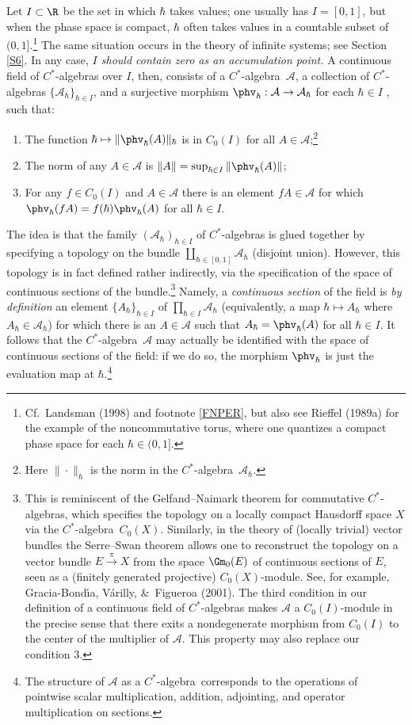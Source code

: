 \documentclass[12pt]{article}
\newcommand{\ca}{$C^*$-algebra} \newcommand{\jba}{JB-algebra}
\newcommand{\raw}{\rightarrow} \newcommand{\rat}{\mapsto}
\newcommand{\CA}{{\mathcal A}} \newcommand{\CB}{{\mathcal B}}
\begin{document}
 Let  $I\subset \R$ be the set in which $\hbar$ takes values; one usually has $I=[0,1]$, but when the phase space is compact, $\hbar$ often takes values in a countable subset of $(0,1]$.\footnote{Cf.\ Landsman (1998) and footnote  \ref{FNPER}, but also see Rieffel (1989a) for the example of the noncommutative torus, where one quantizes a compact phase space for each $\hbar\in(0,1]$.} The same situation occurs in the theory of infinite systems; see Section \ref{S6}.  In any case, {\it $I$ should contain zero as an accumulation point.}  A continuous field of $C^*$-algebras over $I$, then,  consists of a
 \ca\ $\CA$, a collection of \ca s $\{\CA_{\hbar}\}_{{\hbar}\in I}$, and a surjective morphism $\phv_{\hbar}:\CA\raw\CA_{\hbar}$ for each $\hbar\in I$ , such that:
\begin{enumerate}
\item
The function ${\hbar}\mapsto  \|\phv_{\hbar}(A)\|_{\hbar}$ is in $C_0(I)$ for all $A\in\CA$;\footnote{Here $\|\cdot\|_{\hbar}$ is the norm in the \ca\ $\CA_{\hbar}$.}
\item
The norm of any $A\in\CA$ is $\| A\|=\sup_{{\hbar}\in I}\|\phv_{\hbar}(A)\|$;
\item
For any $f\in C_0(I)$ and $A\in\CA$ there is an element $fA\in\CA$ for
which $\phv_{\hbar}(fA)=f({\hbar})\phv_{\hbar}(A)$ for all ${\hbar}\in I$.
\end{enumerate}
 
The idea is that the  family $(\CA_{\hbar})_{\hbar\in I}$ of \ca s is glued together by specifying a topology on the bundle 
$\coprod_{\hbar\in [0,1]}\CA_{\hbar}$ (disjoint union). However, this topology is in fact defined rather indirectly, via the specification of the space of continuous sections of the bundle.\footnote{This is reminiscent of the Gelfand--Naimark theorem for commutative \ca s, which specifies the topology on a locally compact Hausdorff space $X$ via the \ca\ $C_0(X)$. Similarly, in the theory of (locally trivial) vector bundles the Serre--Swan theorem allows one to reconstruct the topology on a vector bundle $E\stackrel{\pi}{\raw} X$ from the space $\Gm_0(E)$ of continuous sections of $E$, seen as a (finitely generated projective) $C_0(X)$-module. See, for example,  Gracia-Bond\'{\i}a,    V\'{a}rilly,  \&\ Figueroa (2001). The third condition in our definition of a continuous field of \ca s makes $\CA$ a $C_0(I)$-module in the precise sense that there exits 
a nondegenerate morphism from $C_0(I)$ to the center of the multiplier of $\CA$. This property may also replace our condition 3.} Namely, a {\it continuous section}
of the field is {\it by definition} an element $\{A_{\hbar}\}_{{\hbar}\in I}$ of $\prod_{{\hbar}\in I}\CA_{\hbar}$ (equivalently, a map $\hbar\mapsto A_{\hbar}$
where $A_{\hbar}\in \CA_{\hbar}$)
 for which there is an $A\in \CA$ such that $A_{\hbar}=\phv_{\hbar}(A)$ for all ${\hbar}\in I$. It follows that
the \ca\ $\CA$ may actually be identified with the space of continuous sections of the field: if we do so, the morphism $\phv_{\hbar}$ is just the evaluation
 map at $\hbar$.\footnote{The structure of $\CA$  as a \ca\ corresponds to the operations of pointwise scalar multiplication,
addition, adjointing, and operator multiplication on sections.}
 
\end{document}
